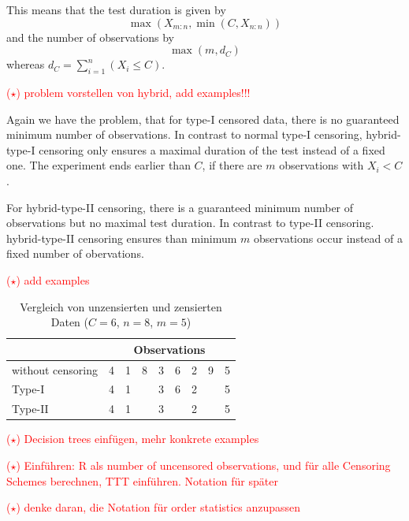 This means that the test duration is given by
\[
\max \left( X_{m:n}, \min \left( C, X_{n:n} \right) \right)
\]
and the number of observations by
\[
\max \left( m, d_C \right)
\]
whereas $d_C = \sum_{i=1}^n (X_i \leq C)$.

\textcolor{red}{($\star$) problem vorstellen von hybrid, add examples!!!}

Again we have the problem, that for type-I censored data, there is no guaranteed minimum number of observations. In contrast to normal type-I censoring, hybrid-type-I censoring only ensures a maximal duration of the test instead of a fixed one. The experiment ends earlier than $C$, if there are $m$ observations with $X_i < C$.

For hybrid-type-II censoring, there is a guaranteed minimum number of observations but no maximal test duration. In contrast to type-II censoring. hybrid-type-II censoring ensures than minimum $m$ observations occur instead of a fixed number of obervations.


\textcolor{red}{($\star$) add examples}


\begin{table}[h]
	\centering
	\begin{tabular}{l|cccccccc}
		& \multicolumn{8}{c}{Observations} \\
		\hline
		without censoring & 4 & 1 & 8 & 3 & 6 & 2 & 9 & 5 \\
		Type-I           & 4 & 1 &   & 3 & 6 & 2 &   & 5 \\
		Type-II          & 4 & 1 &   & 3 &   & 2 &   & 5 \\
	\end{tabular}
	\caption{Vergleich von unzensierten und zensierten Daten ($C = 6$, $n = 8$, $m = 5$)}
	\label{tab:zensierung}
\end{table}


\textcolor{red}{($\star$) Decision trees einfügen, mehr konkrete examples}


\textcolor{red}{($\star$) Einführen: R als number of uncensored observations, und für alle Censoring Schemes berechnen, TTT einführen. Notation für später}


\textcolor{red}{($\star$)  denke daran, die Notation für order statistics anzupassen}
